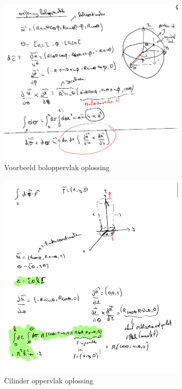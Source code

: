 \documentclass[a4paper]{report}
\begin{document}
\begin{figure}[H]
	\centering
	\includegraphics[width=0.8\textwidth]{assets/voorbeeld_boloppervlak_oplossing.png}
	\caption{Voorbeeld boloppervlak oplossing}
	\label{fig:voorbeeld_boloppervlak_oplossing}
\end{figure}

\begin{figure}[H]
	\centering
	\includegraphics[width=0.8\textwidth]{assets/cilinder_oppervlak_oplossing.png}
	\caption{Cilinder oppervlak oplossing}
	\label{fig:cilinder_oppervlak_oplossing}
\end{figure}
\end{document}
